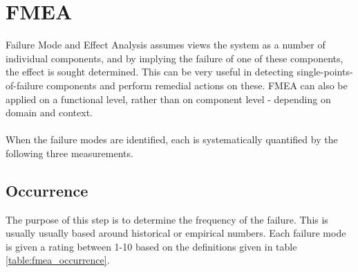 \documentclass[10pt,oneside]{book}                  %
\begin{document}
\section{FMEA}
Failure Mode and Effect Analysis assumes views the system as a number of individual components, and by implying the failure of one of these components, the effect is sought determined. This can be very useful in detecting single-points-of-failure components and perform remedial actions on these. FMEA can also be applied on a functional level, rather than on component level - depending on domain and context.\\
\\
When the failure modes are identified, each is systematically quantified by the following three measurements.

\subsection{Occurrence}
\label{sec:fmea_occurrence}
The purpose of this step is to determine the frequency of the failure. This is usually usually based around historical or empirical numbers. Each failure mode is given a rating between 1-10 based on the definitions given in table \ref{table:fmea_occurrence}.
\end{document}

